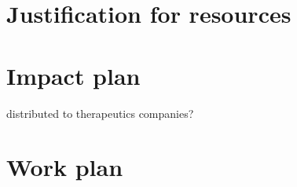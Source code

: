 \documentclass{epsrc}
\begin{document}
\part{Justification for resources}

\part{Impact plan}
distributed to therapeutics companies?

\part{Work plan}



\end{document}
